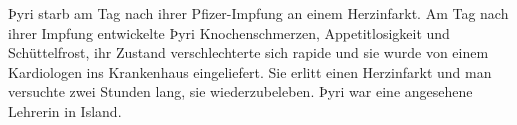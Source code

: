 Þyri starb am Tag nach ihrer Pfizer-Impfung an einem Herzinfarkt. Am Tag nach
ihrer Impfung entwickelte Þyri Knochenschmerzen, Appetitlosigkeit und
Schüttelfrost, ihr Zustand verschlechterte sich rapide und sie wurde von einem
Kardiologen ins Krankenhaus eingeliefert. Sie erlitt einen Herzinfarkt und man
versuchte zwei Stunden lang, sie wiederzubeleben. Þyri war eine angesehene
Lehrerin in Island.
